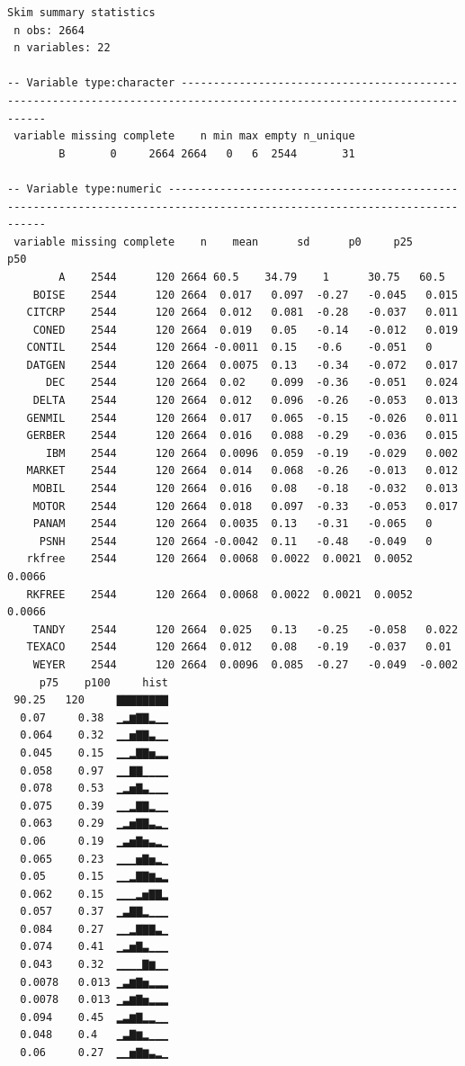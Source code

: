 \documentclass[]{book}
\begin{document}
\begin{verbatim}
Skim summary statistics
 n obs: 2664 
 n variables: 22 

-- Variable type:character -----------------------------------------------------------------------------------------------------------------------
 variable missing complete    n min max empty n_unique
        B       0     2664 2664   0   6  2544       31

-- Variable type:numeric -------------------------------------------------------------------------------------------------------------------------
 variable missing complete    n    mean      sd      p0     p25     p50
        A    2544      120 2664 60.5    34.79    1      30.75   60.5   
    BOISE    2544      120 2664  0.017   0.097  -0.27   -0.045   0.015 
   CITCRP    2544      120 2664  0.012   0.081  -0.28   -0.037   0.011 
    CONED    2544      120 2664  0.019   0.05   -0.14   -0.012   0.019 
   CONTIL    2544      120 2664 -0.0011  0.15   -0.6    -0.051   0     
   DATGEN    2544      120 2664  0.0075  0.13   -0.34   -0.072   0.017 
      DEC    2544      120 2664  0.02    0.099  -0.36   -0.051   0.024 
    DELTA    2544      120 2664  0.012   0.096  -0.26   -0.053   0.013 
   GENMIL    2544      120 2664  0.017   0.065  -0.15   -0.026   0.011 
   GERBER    2544      120 2664  0.016   0.088  -0.29   -0.036   0.015 
      IBM    2544      120 2664  0.0096  0.059  -0.19   -0.029   0.002 
   MARKET    2544      120 2664  0.014   0.068  -0.26   -0.013   0.012 
    MOBIL    2544      120 2664  0.016   0.08   -0.18   -0.032   0.013 
    MOTOR    2544      120 2664  0.018   0.097  -0.33   -0.053   0.017 
    PANAM    2544      120 2664  0.0035  0.13   -0.31   -0.065   0     
     PSNH    2544      120 2664 -0.0042  0.11   -0.48   -0.049   0     
   rkfree    2544      120 2664  0.0068  0.0022  0.0021  0.0052  0.0066
   RKFREE    2544      120 2664  0.0068  0.0022  0.0021  0.0052  0.0066
    TANDY    2544      120 2664  0.025   0.13   -0.25   -0.058   0.022 
   TEXACO    2544      120 2664  0.012   0.08   -0.19   -0.037   0.01  
    WEYER    2544      120 2664  0.0096  0.085  -0.27   -0.049  -0.002 
     p75    p100     hist
 90.25   120     ▇▇▇▇▇▇▇▇
  0.07     0.38  ▁▂▆▇▇▂▁▁
  0.064    0.32  ▁▁▅▇▇▃▁▁
  0.045    0.15  ▁▁▂▇▇▅▂▂
  0.058    0.97  ▁▁▇▇▁▁▁▁
  0.078    0.53  ▁▂▅▇▃▁▁▁
  0.075    0.39  ▁▁▂▇▇▂▁▁
  0.063    0.29  ▁▂▅▇▇▃▂▁
  0.06     0.19  ▁▃▅▇▅▃▂▁
  0.065    0.23  ▁▁▁▅▇▅▂▁
  0.05     0.15  ▁▁▂▇▇▆▃▂
  0.062    0.15  ▁▁▁▂▅▇▇▂
  0.057    0.37  ▁▃▇▇▂▁▁▁
  0.084    0.27  ▁▁▂▇▇▇▃▁
  0.074    0.41  ▁▂▅▇▃▁▁▁
  0.043    0.32  ▁▁▁▁▇▆▁▁
  0.0078   0.013 ▁▃▆▇▅▂▂▂
  0.0078   0.013 ▁▃▆▇▅▂▂▂
  0.094    0.45  ▂▃▆▇▂▂▁▁
  0.048    0.4   ▁▃▇▆▂▁▁▁
  0.06     0.27  ▁▁▅▇▆▃▂▁
\end{verbatim}
\end{document}
